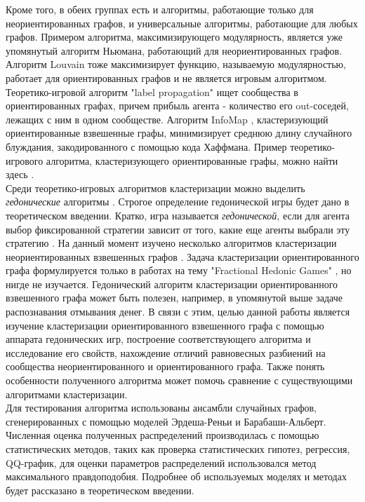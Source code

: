 Кроме того, в обеих группах есть и алгоритмы, работающие только для неориентированных графов, и универсальные алгоритмы, работающие для любых графов. Примером алгоритма, максимизирующего модулярность, является уже упомянутый алгоритм Ньюмана, работающий для неориентированных графов. Алгоритм Louvain тоже максимизирует функцию, называемую модулярностью, работает для ориентированных графов и не является игровым алгоритмом. Теоретико-игровой алгоритм "label propagation" \cite{Raghavan} ищет сообщества в ориентированных графах, причем прибыль агента - количество его out-соседей, лежащих с ним в одном сообществе. Алгоритм InfoMap \cite{infomap}, кластеризующий ориентированные взвешенные графы, минимизирует среднюю длину случайного блуждания, закодированного с помощью кода Хаффмана. Пример теоретико-игрового алгоритма, кластеризующего ориентированные графы, можно найти здесь \cite{Balliu}. \\

Среди теоретико-игровых алгоритмов кластеризации можно выделить \textit{гедонические} алгоритмы \cite{clusteringhg}. Строгое определение гедонической игры будет дано в теоретическом введении. Кратко, игра называется \textit{гедонической}, если для агента выбор фиксированной стратегии зависит от того, какие еще агенты выбрали эту стратегию \cite{framework}. На данный момент изучено несколько алгоритмов кластеризации неориентированных взвешенных графов \cite{clusteringhg}. Задача кластеризации ориентированного графа формулируется только в работах на тему "Fractional Hedonic Games" \cite{fhg2017}, но нигде не изучается. Гедонический алгоритм кластеризации ориентированного взвешенного графа может быть полезен, например, в упомянутой выше задаче распознавания отмывания денег. В связи с этим, целью данной работы является изучение кластеризации ориентированного взвешенного графа с помощью аппарата гедонических игр, построение соответствующего алгоритма и исследование его свойств, нахождение отличий равновесных разбиений на сообщества неориентированного и ориентированного графа. Также понять особенности полученного алгоритма может помочь сравнение с существующими алгоритмами кластеризации.\\

Для тестирования алгоритма использованы ансамбли случайных графов, сгенерированных с помощью моделей Эрдеша-Реньи и Барабаши-Альберт. Численная оценка полученных распределений производилась с помощью статистических методов, таких как проверка статистических гипотез, регрессия, QQ-график, для оценки параметров распределений использовался метод максимального правдоподобия. Подробнее об используемых моделях и методах будет рассказано в теоретическом введении. 